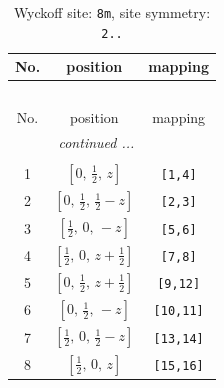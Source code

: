 \documentclass[fleqn,8pt]{jsarticle}
\begin{document}
\begin{longtable}{ccc}
\caption{Wyckoff site: {\tt 8m}, site symmetry: {\tt 2..}}
 \\
 \hline \hline
No. & position & mapping \\ \hline \endfirsthead

\multicolumn{2}{l}{\tablename\ \thetable{}} \\
 \hline \hline
No. & position & mapping \\ \hline \endhead

 \hline \hline
\multicolumn{2}{r}{\footnotesize\it continued ...} \\ \endfoot

 \hline \hline
\multicolumn{2}{r}{} \\ \endlastfoot

1 & $\left[ 0,\, \frac{1}{2},\, z \right]$ & {\tt [1,4]} \\ \hline
2 & $\left[ 0,\, \frac{1}{2},\, \frac{1}{2} - z \right]$ & {\tt [2,3]} \\ \hline
3 & $\left[ \frac{1}{2},\, 0,\, - z \right]$ & {\tt [5,6]} \\ \hline
4 & $\left[ \frac{1}{2},\, 0,\, z + \frac{1}{2} \right]$ & {\tt [7,8]} \\ \hline
5 & $\left[ 0,\, \frac{1}{2},\, z + \frac{1}{2} \right]$ & {\tt [9,12]} \\ \hline
6 & $\left[ 0,\, \frac{1}{2},\, - z \right]$ & {\tt [10,11]} \\ \hline
7 & $\left[ \frac{1}{2},\, 0,\, \frac{1}{2} - z \right]$ & {\tt [13,14]} \\ \hline
8 & $\left[ \frac{1}{2},\, 0,\, z \right]$ & {\tt [15,16]} \\
\end{longtable}
\renewcommand{\arraystretch}{1.2}
\end{document}

